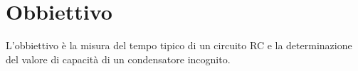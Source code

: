 \section*{Obbiettivo}

L'obbiettivo è la misura del tempo tipico di un circuito RC e la determinazione del valore di capacità di un condensatore incognito.

